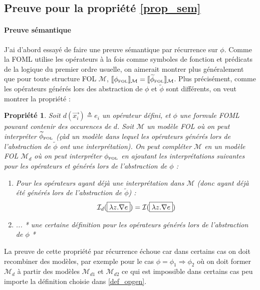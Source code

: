 \documentclass[12pt]{article}
\newcommand{\FOL}{\ensuremath{\textup{\tiny{}FOL}}}
\newcommand{\M}{\ensuremath{\mathcal{M}}}
\newcommand{\I}{\ensuremath{\mathcal{I}}}
\newcommand{\bpar}[1]{\marginpar{\color{myblue}\footnotesize\raggedright#1}}
\newtheorem{prop}{Propriété}
\begin{document}
\subsection{Preuve pour la propriété \ref{prop_sem}}

\paragraph{Preuve sémantique}

J'ai d'abord essayé de faire une preuve sémantique par récurrence sur $\phi$.
Comme la FOML utilise les opérateurs à la fois comme symboles de fonction et prédicats de la logique du premier ordre usuelle, on aimerait montrer plus généralement que pour toute structure FOL $\M$, $\llbracket \phi_\FOL \rrbracket_\M = \llbracket \widetilde{\phi}_\FOL \rrbracket_\M$.
Plus précisément, comme les opérateurs générés lors des abstraction de $\phi$ et $\widetilde{\phi}$ sont différents, on veut montrer la propriété :
\begin{prop}
Soit $d(\vec{x_i}) \triangleq e_i$ un opérateur défini, et $\phi$ une formule FOML pouvant contenir des occurences de $d$.
Soit $\mathcal{M}$ un modèle FOL où on peut interpréter $\widetilde{\phi}_\FOL$ (çàd un modèle dans lequel les opérateurs  générés lors de l'abstraction de $\widetilde{\phi}$ ont une interprétation).
On peut compléter $\M$ en un modèle FOL $\M_d$ où on peut interpréter $\phi_\FOL$ en ajoutant les interprétations suivantes pour les opérateurs  et  générés lors de l'abstraction de $\phi$ :
\begin{enumerate}
\item
  Pour les opérateurs  ayant déjà une interprétation dans $\M$ (donc ayant déjà été générés lors de l'abstraction de $\widetilde{\phi}$) :
  \[ \I_d(\framebox{$\lambda z . \nabla e$}) = \I(\framebox{$\lambda z . \nabla e$}) \]
\item ... * une certaine définition pour les opérateurs générés lors de l'abstraction de $\phi$ * \label{def_opgen}
\end{enumerate}
\end{prop}

La preuve de cette propriété par récurrence échoue car dans certains cas on doit recombiner des modèles, par exemple pour le cas $\phi = \phi_1 \Rightarrow \phi_2$ où on doit former $\M_d$ à partir des modèles $\M_{d1}$ et $\M_{d2}$ ce qui est impossible dans certains cas peu importe la définition choisie dans \ref{def_opgen}.
\end{document}
